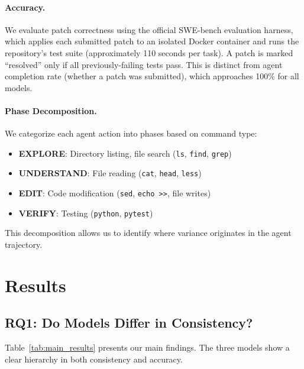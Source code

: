 \documentclass{article}
\begin{document}
\paragraph{Accuracy.} We evaluate patch correctness using the official SWE-bench evaluation harness, which applies each submitted patch to an isolated Docker container and runs the repository's test suite (approximately 110 seconds per task). A patch is marked ``resolved'' only if all previously-failing tests pass. This is distinct from agent completion rate (whether a patch was submitted), which approaches 100\% for all models.

\paragraph{Phase Decomposition.} We categorize each agent action into phases based on command type:
\begin{itemize}
    \item \textbf{EXPLORE}: Directory listing, file search (\texttt{ls}, \texttt{find}, \texttt{grep})
    \item \textbf{UNDERSTAND}: File reading (\texttt{cat}, \texttt{head}, \texttt{less})
    \item \textbf{EDIT}: Code modification (\texttt{sed}, \texttt{echo >>}, file writes)
    \item \textbf{VERIFY}: Testing (\texttt{python}, \texttt{pytest})
\end{itemize}

This decomposition allows us to identify where variance originates in the agent trajectory.

\section{Results}
\label{sec:results}

\subsection{RQ1: Do Models Differ in Consistency?}

Table~\ref{tab:main_results} presents our main findings. The three models show a clear hierarchy in both consistency and accuracy.
\end{document}
